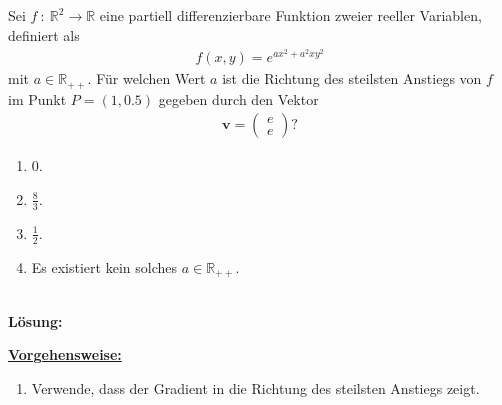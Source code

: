  
\newpage

\subsection*{}
Sei $ f \ : \ \mathbb{R}^2 \to \mathbb{R} $ eine partiell differenzierbare Funktion zweier reeller Variablen, definiert als 
\begin{align*}
	f(x,y) = e^{ax^2 +a^2 xy^2}
\end{align*}
mit $ a \in \mathbb{R}_{++} $. Für welchen Wert $ a $ ist die Richtung des steilsten Anstiegs von $ f $ im Punkt $ P = (1,0.5) $ gegeben durch den Vektor
\begin{align*}
	\textbf{v} =
	\begin{pmatrix}
		e\\
		e
	\end{pmatrix}?
\end{align*}
\renewcommand{\labelenumi}{(\alph{enumi})}
\begin{enumerate}
	\item 
	$0 $.
	\item
	$\frac{8}{3}$.
	\item
	$\frac{1}{2}$.
	\item
	Es existiert kein solches $ a \in \mathbb{R}_{++} $.
\end{enumerate}
\ \\
\textbf{Lösung:}
\begin{mdframed}
\underline{\textbf{Vorgehensweise:}}
\renewcommand{\labelenumi}{\theenumi.}
\begin{enumerate}
\item Verwende, dass der Gradient in die Richtung des steilsten Anstiegs zeigt.
\end{enumerate}
\end{mdframed}


